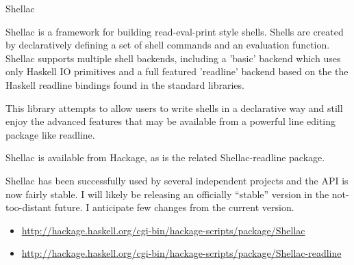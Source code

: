 \documentclass{article}
\begin{document}
\begin{hcarentry}{Shellac}
\makeheader

Shellac is a framework for building read-eval-print style shells.  
Shells are created by declaratively defining a set of shell commands
and an evaluation function.  Shellac supports multiple shell backends,
including a 'basic' backend which uses only Haskell IO primitives and
a full featured 'readline' backend based on the the Haskell readline
bindings found in the standard libraries.

This library attempts to allow users to write shells in a declarative
way and still enjoy the advanced features that may be available from a
powerful line editing package like readline. 

Shellac is available from Hackage, as is the related
Shellac-readline package.

Shellac has been successfully used by several independent projects
and the API is now fairly stable.  I will likely be releasing an
officially ``stable'' version in the not-too-distant future.
I anticipate few changes from the current version.

\FurtherReading
\begin{itemize}
\item \url{http://hackage.haskell.org/cgi-bin/hackage-scripts/package/Shellac}
\item \url{http://hackage.haskell.org/cgi-bin/hackage-scripts/package/Shellac-readline}
\end{itemize}
\end{hcarentry}
\end{document}
